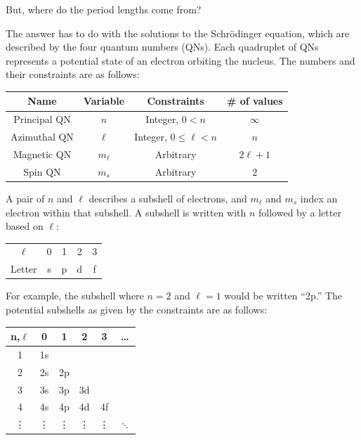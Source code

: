 \documentclass{article}
\begin{document}
But, where do the period lengths come from?


The answer has to do with the solutions to the Schr{\"o}dinger equation,
which are described by the four quantum numbers (QNs).
Each quadruplet of QNs represents a potential state of an electron orbiting the nucleus.
The numbers and their constraints are as follows:

\begin{center}
  \begin{tabular}{|c c c c|}
    \hline
    Name & Variable & Constraints & \# of values \\
    \hline
    Principal QN & $n$ & Integer, $0 < n$ & $\infty$ \\
    Azimuthal QN & $\ell$ & Integer, $0 \leq \ell < n$ &  $n$ \\
    Magnetic QN & $m_\ell$ & Arbitrary & $2\ell+1$ \\
    Spin QN & $m_s$ & Arbitrary & 2 \\
    \hline
  \end{tabular}
\end{center}

A pair of $n$ and $\ell$ describes a subshell of electrons,
and $m_\ell$ and $m_s$ index an electron within that subshell.
A subshell is written with $n$ followed by a letter based on $\ell$:

\begin{center}
  \begin{tabular}{|c|c c c c|}
    \hline
    $\ell$ & 0 & 1 & 2 & 3 \\
    Letter & s & p & d & f \\
    \hline
  \end{tabular}
\end{center}

For example, the subshell where $n=2$ and $\ell=1$ would be written ``2p.''
The potential subshells as given by the constraints are as follows:

\begin{center}
  \begin{tabular}{|c|c c c c c|}
    \hline
    n,$\ell$ & 0 & 1 & 2 & 3 & \ldots \\
    \hline
    1 & 1s & & & & \\
    2 & 2s & 2p & & & \\
    3 &3s & 3p & 3d & & \\
    4 & 4s & 4p & 4d & 4f & \\
    \vdots & \vdots & \vdots & \vdots & \vdots & $\ddots$ \\
    \hline
  \end{tabular}
\end{center}
\end{document}
